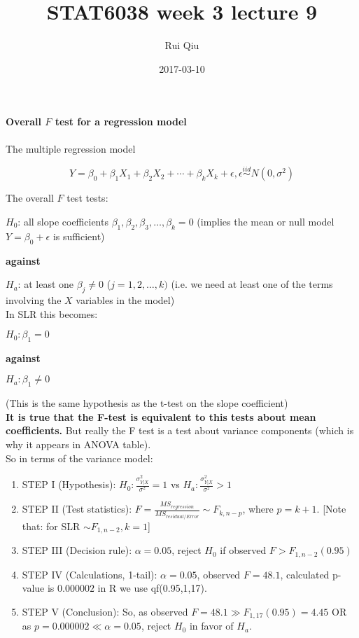 \documentclass[a4paper, 11pt, twoside]{article}
\begin{document}
\title{STAT6038 week 3 lecture 9}
\author{Rui Qiu}
\date{2017-03-10}

\maketitle

\paragraph{Overall $F$ test for a regression model}

The multiple regression model

\[Y = \beta_0 + \beta_1X_1 + \beta_2X_2+\cdots + \beta_kX_k + \epsilon, \epsilon\overset{iid}\sim N(0, \sigma^2)\]

The overall $F$ test tests:

$H_0$: all slope coefficients $\beta_1, \beta_2, \beta_3,\dots, \beta_k = 0$ (implies the mean or null model $Y=\beta_0+\epsilon$ is sufficient)

\textbf{against}

$H_a$: at least one $\beta_j\not =0$ ($j=1,2,\dots,k)$ (i.e. we need at least one of the terms involving the $X$ variables in the model)\\

In SLR this becomes:

$H_0: \beta_1=0$

\textbf{against}

$H_a: \beta_1\not=0$

(This is the same hypothesis as the t-test on the slope coefficient)\\

\textbf{It is true that the F-test is equivalent to this tests about mean coefficients.} But really the F test is a test about variance components (which is why it appears in ANOVA table).\\

So in terms of the variance model:

\begin{enumerate}
	\item STEP I (Hypothesis): $H_0: \frac{\sigma^2_{Y|X}}{\sigma^2} = 1$ vs $H_a: \frac{\sigma^2_{Y|X}}{\sigma^2} > 1$
	\item STEP II (Test statistics): $F=\frac{MS_{regression}}{MS_{residual/Error}} \sim F_{k, n-p}$, where $p=k+1$. [Note that: for SLR $\sim F_{1, n-2}, k=1$]
	\item STEP III (Decision rule): $\alpha=0.05$, reject $H_0$ if observed $F > F_{1, n-2}(0.95)$
	\item STEP IV (Calculations, 1-tail): $\alpha=0.05$, observed $F=48.1$, calculated p-value is $0.000002$ in R we use qf(0.95,1,17).
	\item STEP V (Conclusion): So, as observed $F=48.1 \gg F_{1,17}(0.95) = 4.45$ OR as $p=0.000002 \ll \alpha = 0.05$, reject $H_0$ in favor of $H_a$.
\end{enumerate}
\end{document}

